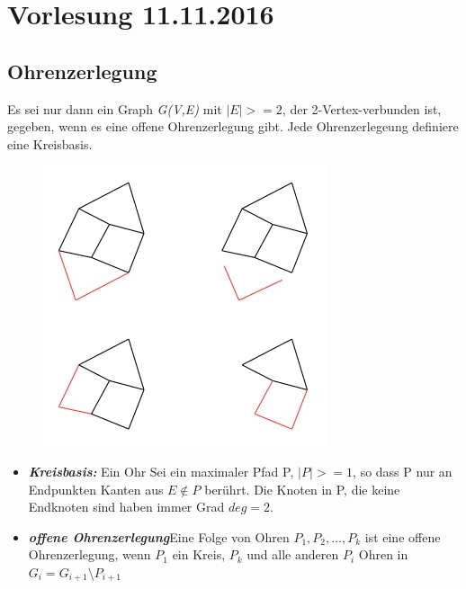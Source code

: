 \section{Vorlesung 11.11.2016}
\subsection{Ohrenzerlegung}

Es sei nur dann ein Graph \textit{G(V,E)} mit $|E|>=2$, der 2-Vertex-verbunden ist, gegeben, wenn es eine offene Ohrenzerlegung gibt. Jede Ohrenzerlegeung definiere eine Kreisbasis.

\begin{figure}[htp]
\centering
\includegraphics[scale=1.00]{lectures/161111/pix/pic1.jpg}
\end{figure}

\begin{itemize}
	\item \textbf{\textit{Kreisbasis:}} \newline Ein Ohr Sei ein maximaler Pfad P, $|P| >= 1$, so dass P nur an Endpunkten Kanten aus $E\notin P$ berührt. Die Knoten in P, die keine Endknoten sind haben immer Grad $deg = 2$.
	\item \textbf{\textit{offene Ohrenzerlegung}}\newline Eine Folge von Ohren $P_1, P_2, ..., P_k$ ist eine offene Ohrenzerlegung, wenn $P_1$ ein Kreis, $P_k$ und alle anderen $P_i$ Ohren in $G_i = G_{i+1} \setminus P_{i+1}$
\end{itemize}

\newpage
